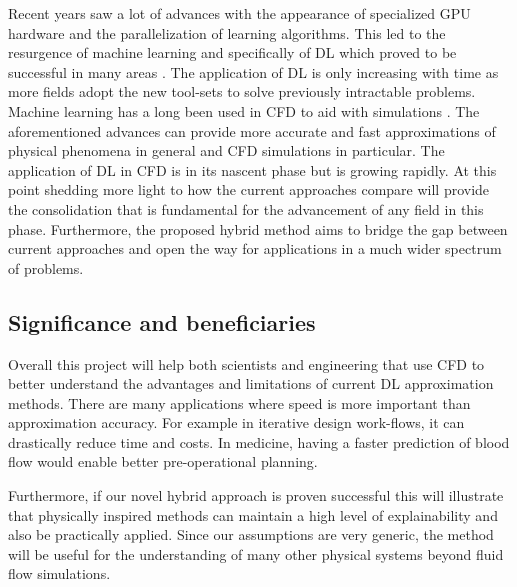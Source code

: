 \documentclass[a4paper,11pt]{article}
\begin{document}
 Recent years saw a lot of advances with the appearance of specialized GPU hardware and the parallelization of learning algorithms. This led to the resurgence of machine learning and specifically of DL which proved to be successful in many areas \cite{lecun2015deep}. The application of DL is only increasing with time as more fields adopt the new tool-sets to solve previously intractable problems. Machine learning has a long been used in CFD to aid with simulations \cite{ferziger2012computationalcfd}. The aforementioned advances can provide more accurate and fast approximations of physical phenomena in general and CFD simulations in particular. The application of DL in CFD is in its nascent phase but is growing rapidly. At this point shedding more light to how the current approaches compare will provide the consolidation that is fundamental for the advancement of any field in this phase. Furthermore, the proposed hybrid method aims to bridge the gap between current approaches and open the way for applications in a much wider spectrum of problems.

\subsection{Significance and beneficiaries}


Overall this project will help both scientists and engineering that use CFD to better understand the advantages and limitations of current DL approximation methods. There are many applications where speed is more important than approximation accuracy. For example in iterative design work-flows, it can drastically reduce time and costs. In medicine, having a faster prediction of blood flow would enable better pre-operational planning.

Furthermore, if our novel hybrid approach is proven successful this will illustrate that physically inspired methods can maintain a high level of explainability and also be practically applied. Since our assumptions are very generic, the method will be useful for the understanding of many other physical systems beyond fluid flow simulations. 
\end{document}
